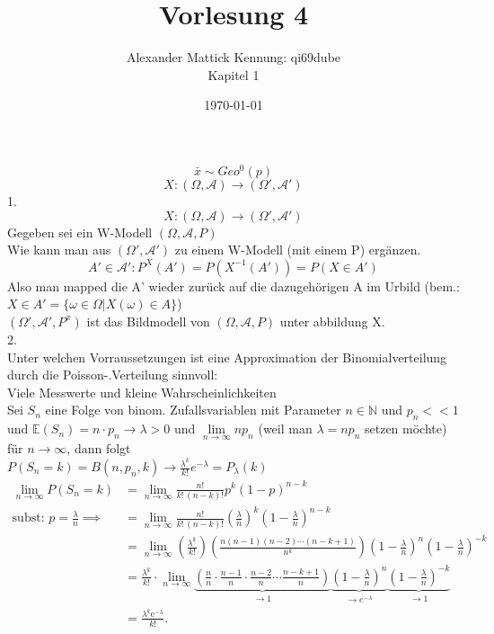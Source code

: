 \documentclass{article}
\author{
Alexander Mattick Kennung: qi69dube\\
Kapitel 1
}
\date{\today}
\title{Vorlesung 4}
\begin{document}
	\maketitle
	\[\bar x\sim Geo^0(p)\]
	\[X:(\Omega, \mathscr{A})\to (\Omega',\mathscr{A}')\]
	1.\\
	\[X:(\Omega, \mathscr{A})\to(\Omega',\mathscr{A}')\]
	Gegeben sei ein W-Modell $(\Omega,\mathscr{A},P)$\\
	Wie kann man aus $(\Omega',\mathscr{A}')$ zu einem W-Modell (mit einem P) ergänzen.\\
	\[A'\in\mathscr{A}': P^X(A')= P(X^{-1}(A')) = P(X\in A')\]
	Also man mapped die A' wieder zurück auf die dazugehörigen A im Urbild (bem.: $X\in A'=\{\omega\in\Omega| X(\omega)\in A\}$)\\
	$(\Omega',\mathcal{A}',P^x)$ ist das Bildmodell von $(\Omega,\mathcal{A},P)$ unter abbildung X.\\
	2.\\
	Unter welchen Vorraussetzungen ist eine Approximation der Binomialverteilung durch die Poisson-.Verteilung sinnvoll:\\
	Viele Messwerte und kleine Wahrscheinlichkeiten\\
	Sei $S_n$ eine Folge von binom. Zufallsvariablen mit Parameter $n\in\mathbb{N}$ und $p_n<<1$ und $\mathbb{E}(S_n) = n\cdot p_n\to \lambda >0$ und $\lim\limits_{n\to\infty} np_n$ (weil man $\lambda =np_n$ setzen möchte) für $n\to\infty$, dann folgt\\
	$P(S_n=k)= B(n,p_n,k) \to \frac{\lambda^k}{k!} e^{-\lambda} = P_\lambda(k)$\\
	\begin{align}\lim_{n\to\infty}P(S_n=k) & = \lim_{n\to\infty}\frac{n!}{k!\,(n-k)!}p^{k}\left(1-p\right)^{n-k}\\
	\text{subst: }p=\frac{\lambda}{n}\implies& =\lim_{n\to\infty}\frac{n!}{k!\,(n-k)!}\left(\frac{\lambda}{n}\right)^{k}\left(1-\frac{\lambda}{n}\right)^{n-k}\\
	 & =\lim_{n\to\infty}\left(\frac{\lambda^{k}}{k!}\right)\left(\frac{n(n-1)(n-2)\cdots(n-k+1)}{n^{k}}\right)\left(1-\frac{\lambda}{n}\right)^{n}\left(1-\frac{\lambda}{n}\right)^{-k}\\
	 & =\frac{\lambda^{k}}{k!}\cdot\lim_{n\to\infty}\underbrace{\left(\frac{n}{n}\cdot\frac{n-1}{n}\cdot\frac{n-2}{n}\cdots\frac{n-k+1}{n}\right)}_{\to1}\underbrace{\left(1-\frac{\lambda}{n}\right)^{n}}_{\to e^{-\lambda}}\underbrace{\left(1-\frac{\lambda}{n}\right)^{-k}}_{\to1}\\
	 & =\frac{\lambda^{k}\mathrm{e}^{-\lambda}}{k!}.
	 \end{align}
\end{document}

